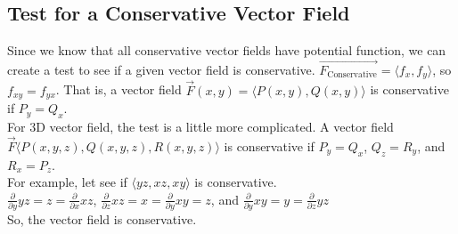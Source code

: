 \subsection{Test for a Conservative Vector Field}
\noindent
Since we know that all conservative vector fields have potential function, we can create a test to see if a given vector field is conservative. $\vec{F_{\text{Conservative}}} = \langle f_x, f_y \rangle$, so $f_{xy} = f_{yx}$. That is, a vector field $\vec{F}(x,y) = \langle P(x,y), Q(x,y) \rangle$ is conservative if $P_y = Q_x$.\\
For 3D vector field, the test is a little more complicated. A vector field $\vec{F}\langle P(x,y,z), Q(x,y,z), R(x,y,z)\rangle$ is conservative if $P_y = Q_x$, $Q_z = R_y$, and $R_x = P_z$.\\

\noindent
For example, let see if $\langle yz, xz, xy\rangle$ is conservative.\\
\indent
$\frac{\partial}{\partial y}yz = z = \frac{\partial}{\partial x}xz$, $\frac{\partial}{\partial z}xz = x = \frac{\partial}{\partial y}xy = z$, and $\frac{\partial}{\partial y}xy = y = \frac{\partial}{\partial z}yz$\\
\indent
So, the vector field is conservative.